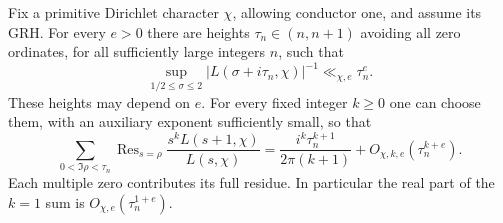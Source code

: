 \begin{lemma}
\label{lem:A039-dirichlet-trace}
Fix a primitive Dirichlet character $\chi$, allowing conductor one,
and assume its GRH. For every $e>0$ there are heights
$\tau_n\in(n,n+1)$ avoiding all zero ordinates, for all sufficiently
large integers $n$, such that
\begin{equation}\label{eq:A039-good-heights}
 \sup_{1/2\le\sigma\le2}
       |L(\sigma+i\tau_n,\chi)|^{-1}\ll_{\chi,e}\tau_n^e.
\end{equation}
These heights may depend on $e$. For every fixed integer $k\ge0$
one can choose them, with an auxiliary exponent sufficiently small,
so that
\begin{equation}\label{eq:A039-trace}
 \sum_{0<\Im\rho<\tau_n}
 \operatorname{Res}_{s=\rho}
        \frac{s^kL(s+1,\chi)}{L(s,\chi)}
 =\frac{i^k\tau_n^{k+1}}{2\pi(k+1)}
                  +O_{\chi,k,e}(\tau_n^{k+e}).
\end{equation}
Each multiple zero contributes its full residue. In particular the
real part of the $k=1$ sum is $O_{\chi,e}(\tau_n^{1+e})$.
\end{lemma}

